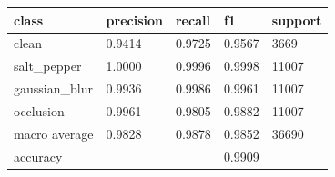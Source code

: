 \begin{tabular}{lllll}
\hline
class & precision & recall & f1 & support \\
\hline
clean & 0.9414 & 0.9725 & 0.9567 & 3669 \\
salt\_pepper & 1.0000 & 0.9996 & 0.9998 & 11007 \\
gaussian\_blur & 0.9936 & 0.9986 & 0.9961 & 11007 \\
occlusion & 0.9961 & 0.9805 & 0.9882 & 11007 \\
macro average & 0.9828 & 0.9878 & 0.9852 & 36690 \\
accuracy &  &  & 0.9909 &  \\
\hline
\end{tabular}
